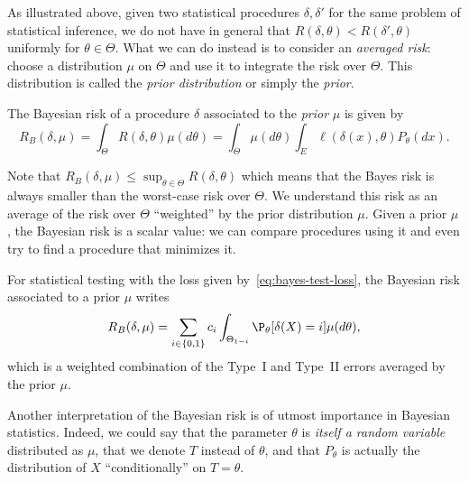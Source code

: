 
As illustrated above, given two statistical procedures $\delta, \delta'$ for the same problem of statistical inference, we do not have in general that $R(\delta, \theta) < R(\delta', \theta)$ uniformly for $\theta \in \Theta$.
What we can do instead is to consider an \emph{averaged risk}: choose a distribution $\mu$ on $\Theta$ and use it to integrate the risk over $\Theta$.
This distribution is called the \emph{prior distribution} or simply the \emph{prior}.
\begin{definition}
	The Bayesian risk of a procedure $\delta$ associated to the \emph{prior} $\mu$ is given by
	\begin{equation*}
		R_B(\delta, \mu) = \int_{\Theta} R(\delta, \theta) \mu(d \theta) 
		= \int_{\Theta} \mu(d \theta) \int_E \ell(\delta(x), \theta) P_\theta(dx).
	\end{equation*}
\end{definition}
Note that $R_B(\delta, \mu) \leq \sup_{\theta \in \Theta} R(\delta, \theta)$ which means that the Bayes risk is always smaller than the worst-case risk over $\Theta$.
We understand this risk as an average of the risk over $\Theta$ ``weighted'' by the prior distribution $\mu$.
Given a prior $\mu$, the Bayesian risk is a scalar value: we can compare procedures using it and even try to find a procedure that minimizes it.%

\begin{example}
	For statistical testing with the loss given by~\eqref{eq:bayes-test-loss}, the Bayesian risk associated to a prior $\mu$ writes
	\begin{align*}
		R_B(\delta, \mu) = \sum_{i \in \{ 0, 1 \}} c_i \int_{\Theta_{1 - i}} \P_\theta[\delta(X) = i] \mu(d \theta),
	\end{align*}
	which is a weighted combination of the Type~I and Type~II errors averaged by the prior $\mu$.
\end{example}

Another interpretation of the Bayesian risk is of utmost importance in Bayesian statistics.
Indeed, we could say that the parameter $\theta$ is \emph{itself a random variable} distributed as $\mu$, that we denote $T$ instead of $\theta$, and that $P_\theta$ is actually the distribution of $X$ ``conditionally'' on $T = \theta$.%

